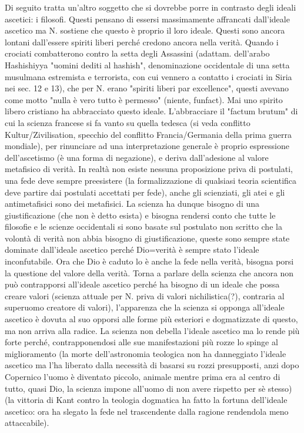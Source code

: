 \documentclass[10pt,a4paper]{article}
\begin{document}
Di seguito tratta un'altro soggetto che si dovrebbe porre in contrasto degli ideali ascetici: i filosofi. Questi pensano di essersi massimamente affrancati dall'ideale ascetico ma N. sostiene che questo è proprio il loro ideale. Questi sono ancora lontani dall'essere spiriti liberi perché credono ancora nella verità. Quando i crociati combatterono contro la setta degli Assassini (adattam. dell’arabo Hashishiyya "uomini dediti al hashish", denominazione occidentale di una setta musulmana estremista e terrorista, con cui vennero a contatto i crociati in Siria nei sec. 12 e 13), che per N. erano "spiriti liberi par excellence", questi avevano come motto "nulla è vero tutto è permesso" (niente, funfact). Mai uno spirito libero cristiano ha abbracciato questo ideale. L'abbracciare il "factum brutum" di cui la scienza francese si fa vanto su quella tedesca (si veda conflitto Kultur/Zivilisation, specchio del conflitto Francia/Germania della prima guerra mondiale), per rinunciare ad una interpretazione generale è proprio espressione dell'ascetismo (è una forma di negazione), e deriva dall'adesione al valore metafisico di verità. In realtà non esiste nessuna proposizione priva di postulati, una fede deve sempre preesistere (la formalizzazione di qualsiasi teoria scientifica deve partire dai postulati accettati per fede), anche gli scienziati, gli atei e gli antimetafisici sono dei metafisici. La scienza ha dunque bisogno di una giustificazione (che non è detto esista) e bisogna rendersi conto che tutte le filosofie e le scienze occidentali si sono basate sul postulato non scritto che la volontà di verità non abbia bisogno di giustificazione, queste sono sempre state dominate dall'ideale ascetico perché Dio=verità è sempre stato l'ideale inconfutabile. Ora che Dio è caduto lo è anche la fede nella verità, bisogna porsi la questione del valore della verità. Torna a parlare della scienza che ancora non può contrapporsi all'ideale ascetico perché ha bisogno di un ideale che possa creare valori (scienza attuale per N. priva di valori nichilistica(?), contraria al superuomo creatore di valori), l'apparenza che la scienza si opponga all'ideale ascetico è dovuta al suo opporsi alle forme più esteriori e dogmatizzate di questo, ma non arriva alla radice. La scienza non debella l'ideale ascetico ma lo rende più forte perché, contrapponendosi alle sue manifestazioni più rozze lo spinge al miglioramento (la morte dell'astronomia teologica non ha danneggiato l'ideale ascetico ma l'ha liberato dalla necessità di basarsi su rozzi presupposti, anzi dopo Copernico l'uomo è diventato piccolo, animale mentre prima era al centro di tutto, quasi Dio, la scienza impone all'uomo di non avere rispetto per sè stesso) (la vittoria di Kant contro la teologia dogmatica ha fatto la fortuna dell'ideale ascetico: ora ha slegato la fede nel trascendente dalla ragione rendendola meno attaccabile).\\
\end{document}
